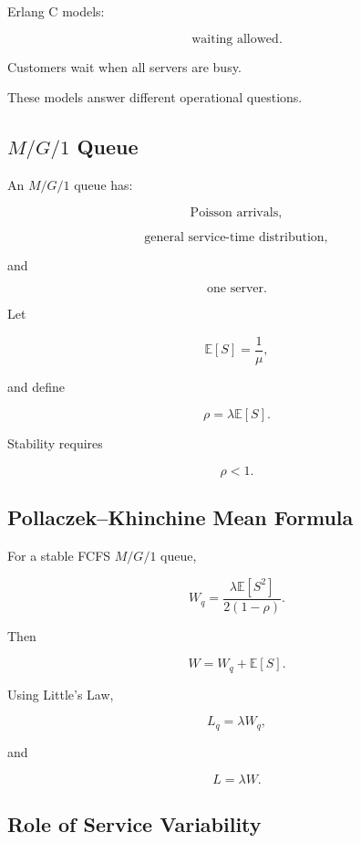 Erlang C models:

\[
\boxed{
\text{waiting allowed}.
}
\]

Customers wait when all servers are busy.

These models answer different operational questions.

\subsection{\(M/G/1\) Queue}
\label{subsec:mg1-queue}

An \(M/G/1\) queue has:

\[
\boxed{
\text{Poisson arrivals},
}
\]

\[
\boxed{
\text{general service-time distribution},
}
\]

and

\[
\boxed{
\text{one server}.
}
\]

Let

\[
\mathbb{E}[S]
=
\frac1\mu,
\]

and define

\[
\boxed{
\rho
=
\lambda
\mathbb{E}[S].
}
\]

Stability requires

\[
\boxed{
\rho<1.
}
\]

\subsection{Pollaczek--Khinchine Mean Formula}
\label{subsec:pollaczek-khinchine}

For a stable FCFS \(M/G/1\) queue,

\[
\boxed{
W_q
=
\frac{
\lambda
\mathbb{E}[S^2]
}{
2(1-\rho)
}.
}
\]

Then

\[
\boxed{
W
=
W_q
+
\mathbb{E}[S].
}
\]

Using Little's Law,

\[
\boxed{
L_q
=
\lambda W_q,
}
\]

and

\[
\boxed{
L
=
\lambda W.
}
\]

\subsection{Role of Service Variability}
\label{subsec:service-variability}

